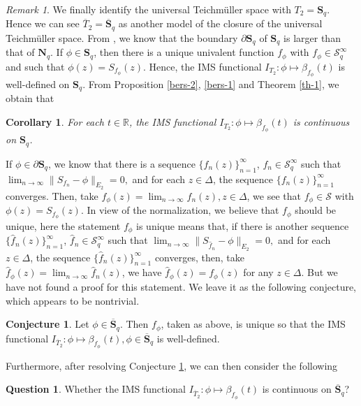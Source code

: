\documentclass[11pt]{amsart}
\newtheorem{corollary}[theorem]{Corollary}
\theoremstyle{remark}
\newtheorem{remark}[theorem]{Remark}
\theoremstyle{claim}
\theoremstyle{definition}
\theoremstyle{problem}
\theoremstyle{conjecture}
\newtheorem{conjecture}[theorem]{Conjecture}
\theoremstyle{question}
\newtheorem{question}[theorem]{Question}
\numberwithin{equation}{section}
\begin{document}
\begin{remark}We finally identify the universal Teichm\"uller space with $T_2=\mathbf{S}_q$. Hence we can see $\overline{T}_2=\overline{\mathbf{S}}_q$ as another model of the closure of the universal Teichm\"uller space. From \cite{AG2}, we know that the boundary $\partial\mathbf{S}_q$ of $\mathbf{S}_q$ is larger than that of $\mathbf{N}_q$.  If $\phi\in \mathbf{S}_q$, then there is a unique univalent function $f_{\phi}$ with $f_{\phi}\in \mathcal{S}_q^{\infty}$ and such that $\phi(z)=S_{f_{\phi}}(z).$  Hence, the IMS functional $I_{T_2}: \phi \mapsto \beta_{f_{\phi}}(t)$ is well-defined on $\mathbf{S}_q$.  From Proposition \ref{bers-2}, \ref{bers-1} and Theorem \ref{th-1}, we obtain that
\begin{corollary}
For each $t\in \mathbb{R}$, the IMS functional $I_{T_2}: \phi \mapsto \beta_{f_{\phi}}(t)$ is continuous on $\mathbf{S}_q$.
\end{corollary} 
 If $\phi\in \partial\mathbf{S}_q$, we know that there is a sequence $\{f_n(z)\}_{n=1}^{\infty}$, $f_{n}\in \mathcal{S}_q^{\infty}$ such that $\lim_{n\rightarrow\infty}\|S_{f_n}-\phi\|_{E_2}=0,$ and for each $z\in \Delta$, the sequence $\{f_n(z)\}_{n=1}^{\infty}$ converges. Then, take $f_\phi(z)=\lim_{n\rightarrow\infty}f_n(z), z\in \Delta$, we see that $f_{\phi}\in \mathcal{S}$ with $\phi(z)=S_{f_{\phi}}(z)$. In view of the normalization,  we believe that $f_{\phi}$ should be unique, here the statement  $f_{\phi}$ is unique means that, if there is another sequence $\{\widehat{f}_n(z)\}_{n=1}^{\infty}$, $\widehat{f}_{n}\in \mathcal{S}_q^{\infty}$ such that $\lim_{n\rightarrow\infty}\|S_{\widehat{f}_n}-\phi\|_{E_2}=0,$ and for each $z\in \Delta$, the sequence $\{\widehat{f}_n(z)\}_{n=1}^{\infty}$ converges, then, take $\widehat{f}_\phi(z)=\lim_{n\rightarrow\infty}\widehat{f}_n(z)$, we have $\widehat{f}_{\phi}(z)=f_{\phi}(z)$ for any $z\in \Delta$.  But we have not found a proof for this statement. We leave it as the following conjecture, which appears to be nontrivial.
 \begin{conjecture}\label{q-3}
 Let $\phi \in \overline{\mathbf{S}}_q$. Then $f_{\phi}$, taken as above, is unique so that the IMS functional $I_{\overline{T}_2}: \phi \mapsto \beta_{f_{\phi}}(t), \phi \in \overline{\mathbf{S}}_q$ is well-defined.
  \end{conjecture}
Furthermore, after resolving Conjecture \ref{q-3}, we can then consider the following
  \begin{question}\label{q-2}
Whether the IMS functional $I_{\overline{T}_2}: \phi \mapsto \beta_{f_{\phi}}(t)$ is continuous on $\overline{\mathbf{S}}_q$?
  \end{question}
 \end{remark} 
 
\end{document}
